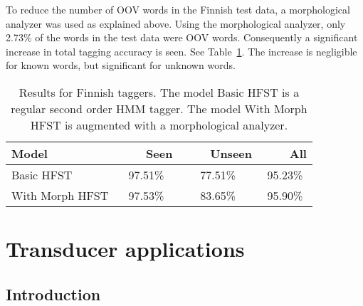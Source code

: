 \documentclass{llncs}
\begin{document}
To reduce the number of OOV words in the Finnish test data, a
morphological analyzer was used as explained above. Using the
morphological analyzer, only 2.73\% of the words in the test data
were OOV words. Consequently a significant increase in total tagging
accuracy is seen. See Table~\ref{fin-tagging-acc}. The increase is
negligible for known words, but significant for unknown words.

\begin{table}
  \caption{Results for Finnish taggers. The model Basic HFST is a
    regular second order HMM tagger. The model With Morph HFST is
    augmented with a morphological analyzer.}\label{fin-tagging-acc}
  \begin{center}
    \begin{tabular}{lccc}
      \hline 
      Model            & ~~~~Seen & ~~~~Unseen & ~~~~All \\
      \hline 
      Basic HFST       &  97.51\% &    77.51\% & 95.23\% \\
      With Morph HFST  &  97.53\% &    83.65\% & 95.90\% \\
      \hline
    \end{tabular}
  \end{center}
\end{table}


\section{Transducer applications}\label{Applications}

\subsection{Introduction}
\end{document}
